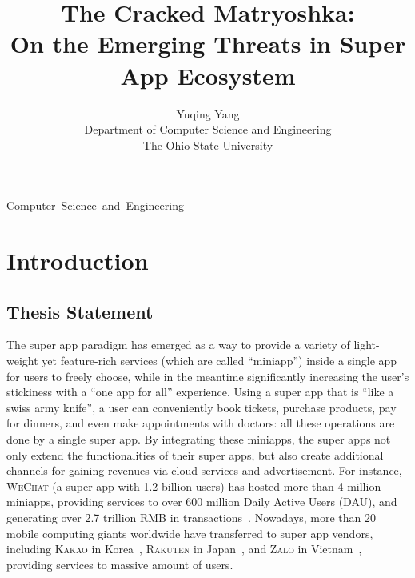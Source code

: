 \documentclass{osudissert96}
\begin{document}
\vspace{-2in}
\title{The Cracked Matryoshka: \\On the Emerging Threats in Super App Ecosystem }
\author{Yuqing Yang\\Department of Computer Science and Engineering\\The Ohio State University}
\unit{Computer Science and Engineering}



\maketitle
\disscopyright

\begin{abstract}
  
\end{abstract}

\dedication{Dedicated to myself, and the other twelve me}





\tableofcontents
\listoftables
\listoffigures


\chapter{Introduction}
\section{Thesis Statement}
The super app paradigm has emerged as a way to provide a variety of light-weight yet feature-rich services (which are called ``miniapp'') inside a single app for users to freely choose, while in the meantime significantly increasing the user's stickiness with a ``one app for all'' experience. Using a super app that is ``like a swiss army knife'', a user can conveniently book tickets, purchase products, pay for dinners, and even make appointments with doctors: all these operations are done by a single super app. By integrating these miniapps, the super apps not only extend the functionalities of their super apps, but also create additional channels for gaining revenues via cloud services and advertisement. For instance, \textsc{WeChat} (a super app with 1.2 billion users) has hosted more than 4 million miniapps, providing services to over 600 million Daily Active Users (DAU), and generating over 2.7 trillion RMB in transactions~\cite{wechatreport2023}. Nowadays, more than 20 mobile computing giants worldwide have transferred to super app vendors, including  \textsc{Kakao} in Korea~\cite{superapps2021mau}, \textsc{Rakuten} in Japan~\cite{superapps2021mau}, and \textsc{Zalo} in Vietnam~\cite{zalo2021mau}, providing services to massive amount of users. 
\end{document}
